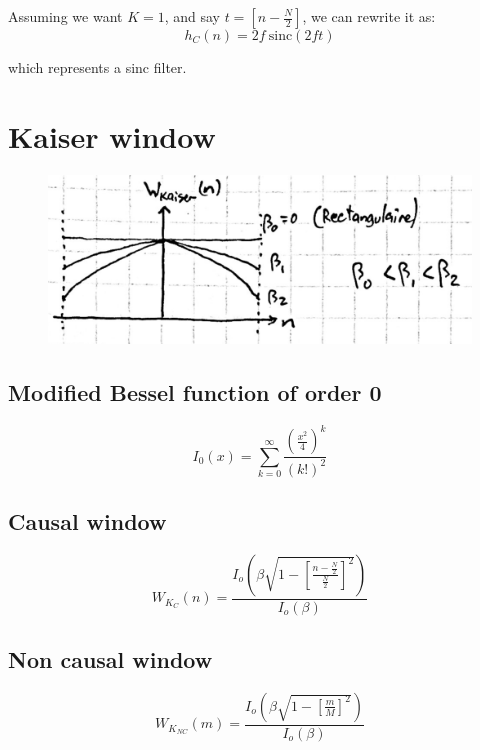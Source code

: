 \documentclass{article}
\begin{document}
Assuming we want $K=1$, and say $t=\left[n-\frac{N}{2}\right]$, we can rewrite it as:
\begin{equation}
    h_C\left(n\right) = 2f ~ \text{sinc} \left(2ft\right)
\end{equation}

which represents a sinc filter.


\section{Kaiser window}
\begin{figure}[!ht]
    \includegraphics{kaiser-window}
\end{figure}
\subsection{Modified Bessel function of order 0}
\begin{equation}
    I_0\left(x\right) = \sum_{k=0}^{\infty}\frac{\left(\frac{x^2}{4}\right)^k}{\left(k!\right)^2}
\end{equation}

\subsection{Causal window}
\begin{equation}
    W_{K_{C}}\left(n\right) = \frac{I_o\left(\beta\sqrt{1-\left[\frac{n-\frac{N}{2}}{\frac{N}{2}}\right]^2}\right)}{I_o\left(\beta\right)}
\end{equation}

\subsection{Non causal window}
\begin{equation}
    W_{K_{NC}}\left(m\right) = \frac{I_o\left(\beta\sqrt{1-\left[\frac{m}{M}\right]^2}\right)}{I_o\left(\beta\right)}
\end{equation}
\end{document}
